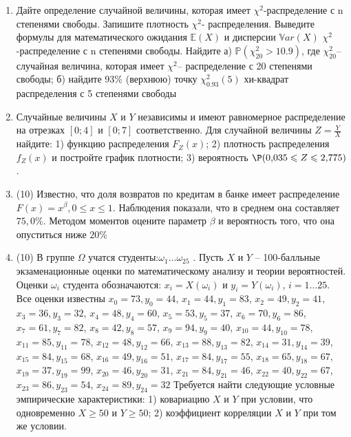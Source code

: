 \documentclass[a4paper,10pt]{article}
\begin{document}
\begin{enumerate}


\item


Дайте определение случайной величины, которая имеет $\chi ^{2}$-распределение с n степенями свободы.
Запишите плотность $\chi ^{2}$- распределения. Выведите формулы для математического ожидания $\mathbb{E}(X)$ и дисперсии $\mathbb{V}ar(X)$ $\chi ^{2}$-распределение с n степенями свободы. Найдите а) $\mathbb{P}(\chi _{20}^{2} > 10.9)$, где $\chi _{20}^{2}$–случайная величина, которая имеет $\chi ^{2}$– распределение с 20 степенями свободы; б) найдите 93\%
(верхнюю) точку $\chi _{0.93}^{2} (5)$ хи-квадрат распределения с 5 степенями свободы


\item



Случайные величины $X$ и $Y$ независимы и имеют равномерное
распределение на отрезках $[0;4]$ и $[0;7]$ соответственно. Для случайной величины $Z=\frac{Y}{X}$ найдите: 
1) функцию распределения $F_Z(x)$;
2) плотность распределения $f_Z(x)$ и постройте график плотности;
3) вероятность $\P(0,\!035\leqslant Z\leqslant 2,\!775)$.


\item


(10) Известно, что доля возвратов по кредитам в банке имеет распределение $F(x) = x ^{\beta}, 0 \leqslant x \leqslant 1$.
Наблюдения показали, что в среднем она составляет $75,0\%$. Методом моментов оцените параметр $\beta$ и
вероятность того, что она опуститься ниже $20\%$


\item


(10) В группе $\Omega$ учатся студенты:$\omega _{1}...\omega _{25}$ . Пусть $X$ и $Y$ – 100-балльные экзаменационные оценки по
математическому анализу и теории вероятностей. Оценки $\omega _{i}$ студента обозначаются: $x _{i} = X(\omega _{i})$ и $y _{i} = Y(\omega _{i})$, $i = 1...25$. Все оценки известны
$x _{0} = 73, y _{0} = 44$, $x _{1} = 44, y _{1} = 83$, $x _{2} = 49, y _{2} = 41$, $x _{3} = 36, y _{3} = 32$, $x _{4} = 48, y _{4} = 60$, $x _{5} = 53, y _{5} = 37$, $x _{6} = 70, y _{6} = 86$, $x _{7} = 61, y _{7} = 82$, $x _{8} = 42, y _{8} = 57$, $x _{9} = 94, y _{9} = 40$, $x _{10} = 44, y _{10} = 78$, $x _{11} = 85, y _{11} = 78$, $x _{12} = 48, y _{12} = 66$, $x _{13} = 88, y _{13} = 82$, $x _{14} = 31, y _{14} = 39$, $x _{15} = 84, y _{15} = 68$, $x _{16} = 49, y _{16} = 51$, $x _{17} = 84, y _{17} = 55$, $x _{18} = 65, y _{18} = 67$, $x _{19} = 37, y _{19} = 99$, $x _{20} = 46, y _{20} = 31$, $x _{21} = 84, y _{21} = 46$, $x _{22} = 40, y _{22} = 67$, $x _{23} = 86, y _{23} = 54$, $x _{24} = 89, y _{24} = 32$
Требуется
найти следующие условные эмпирические характеристики: 1) ковариацию $X$ и $Y$ при условии, что одновременно $X \geqslant 50$
 и $Y \geqslant 50$; 2) коэффициент корреляции $X$ и $Y$ при том же условии.



\end{enumerate}
\end{document}
